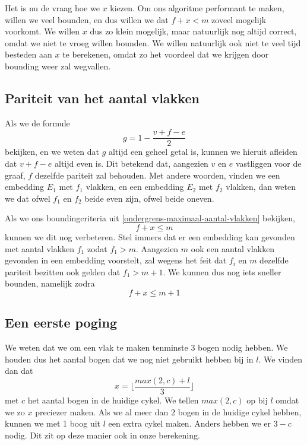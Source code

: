 \documentclass{article}
\begin{document}
Het is nu de vraag hoe we $x$ kiezen. Om ons algoritme performant te maken,
willen we veel bounden, en dus willen we dat $f + x < m$ zoveel mogelijk
voorkomt. We willen $x$ dus zo klein mogelijk, maar natuurlijk nog altijd
correct, omdat we niet te vroeg willen bounden. We willen natuurlijk ook niet
te veel tijd besteden aan $x$ te berekenen, omdat zo het voordeel dat we krijgen
door bounding weer zal wegvallen.

\subsection{Pariteit van het aantal vlakken}
Als we de formule
\begin{equation*}
g = 1 - \frac{v + f - e}{2}
\end{equation*}
bekijken, en we weten dat $g$ altijd een geheel getal is, kunnen we hieruit
afleiden dat $v + f - e$ altijd even is. Dit betekend dat, aangezien $v$ en $e$
vastliggen voor de graaf, $f$ dezelfde pariteit zal behouden. Met andere
woorden, vinden we een embedding $E_1$ met $f_1$ vlakken, en een embedding $E_2$
met $f_2$ vlakken, dan weten we dat ofwel $f_1$ en $f_2$ beide even zijn, ofwel
beide oneven.

Als we ons boundingcriteria uit \ref{ondergrens-maximaal-aantal-vlakken}
bekijken,
\begin{equation*}
f + x \leq m
\end{equation*}
kunnen we dit nog verbeteren. Stel immers dat er een embedding kan gevonden met
aantal vlakken $f_1$ zodat $f_1 > m$. Aangezien $m$ ook een aantal vlakken
gevonden in een embedding voorstelt, zal wegens het feit dat $f_i$ en $m$
dezelfde pariteit bezitten ook gelden dat $f_1 > m + 1$. We kunnen dus nog iets
sneller bounden, namelijk zodra
\begin{equation*}
f + x \leq m + 1
\end{equation*}

\subsection{Een eerste poging}
\label{een-eerste-poging}
We weten dat we om een vlak te maken tenminste 3 bogen nodig hebben. We
houden dus het aantal bogen dat we nog niet gebruikt hebben bij in $l$. We vinden
dan dat
\begin{equation*}
x = \lfloor\frac{max(2, c) + l}{3}\rfloor
\end{equation*}
met $c$ het aantal bogen in de huidige cykel. We tellen $max(2, c)$ op bij $l$
omdat we zo $x$ preciezer maken. Als we al meer dan 2 bogen in de huidige
cykel hebben, kunnen we met 1 boog uit $l$ een extra cykel maken. Anders
hebben we er $3 - c$ nodig. Dit zit op deze manier ook in onze berekening.
\end{document}
